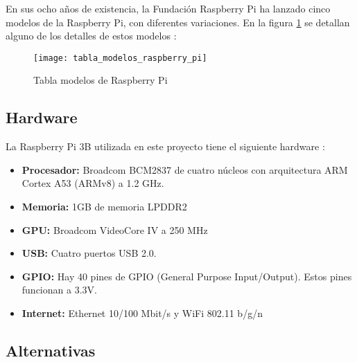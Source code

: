             En sus ocho años de existencia, la Fundación Raspberry Pi ha lanzado cinco modelos de la Raspberry Pi, con
            diferentes variaciones. En la figura \ref{fig:ImagenModelosPi} se detallan alguno de los detalles de estos
            modelos \cite{raspberry_pi_wikipedia_en}:

            \begin{figure}[ht]
                \centering
                \texttt{[image: tabla\_modelos\_raspberry\_pi]}
                \caption{Tabla modelos de Raspberry Pi \cite{raspberry_pi_wikipedia_en}\label{fig:ImagenModelosPi}}
            \end{figure}

            \newpage


        \subsection{Hardware} %
        \label{sub:HardwareRaspberryPi}

            La Raspberry Pi 3B utilizada en este proyecto tiene el siguiente hardware \cite{raspberry_pi_hardware}:

            \begin{itemize}
                \item \textbf{Procesador:} Broadcom BCM2837 de cuatro núcleos con arquitectura ARM Cortex A53 (ARMv8) a
                1.2 GHz.
                \item \textbf{Memoria:} 1GB de memoria LPDDR2
                \item \textbf{GPU:} Broadcom VideoCore IV a 250 MHz
                \item \textbf{USB:} Cuatro puertos USB 2.0.
                \item \textbf{GPIO:} Hay 40 pines de GPIO (General Purpose Input/Output). Estos pines funcionan a 3.3V.
                \item \textbf{Internet:} Ethernet 10/100 Mbit/s y WiFi 802.11 b/g/n
            \end{itemize}


        \subsection{Alternativas} %
        \label{sub:AlternativasRaspberryPi}

